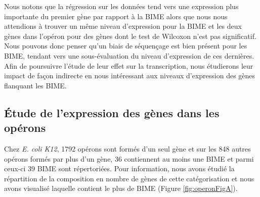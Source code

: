 \documentclass[12pt,a4paper]{report}
\begin{document}
\begin{onehalfspace}
Nous notons que la régression sur les données tend vers une expression plus importante du premier gène par rapport à la BIME alors que nous nous attendions à trouver un même niveau d'expression pour la BIME et les deux gènes dans l'opéron pour des gènes dont le test de Wilcoxon n'est pas significatif. Nous pouvons donc penser qu'un biais de séquençage est bien présent pour les BIME, tendant vers une sous-évaluation du niveau d'expression de ces dernières. Afin de poursuivre l'étude de leur effet sur la transcription, nous étudierons leur impact de façon indirecte en nous intéressant aux niveaux d'expression des gènes flanquant les BIME.

\subsection*{Étude de l'expression des gènes dans les opérons}
Chez \textit{E. coli K12}, 1792 opérons sont formés d'un seul gène et sur les 848 autres opérons formés par plus d'un gène, 36 contiennent au moins une BIME et parmi ceux-ci 39 BIME sont répertoriées. Pour information, nous avons étudié la répartition de la composition en nombre de gènes de cette catégorisation et nous avons visualisé laquelle contient le plus de BIME (Figure \autoref{fig:operonFigA}).


\end{onehalfspace}
\end{document}
